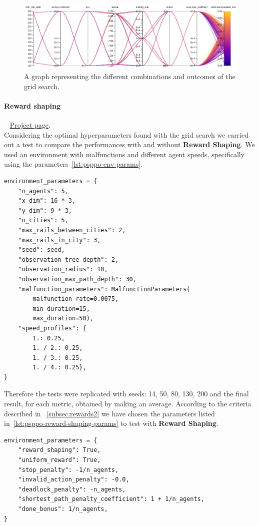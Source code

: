 \documentclass[11pt, a4paper, hidelinks]{report}
\begin{document}
\begin{figure}
\centering
\includegraphics[width=1.0\textwidth]{resources/psppo_sweep.png}
\caption{A graph representing the different combinations and outcomes of the grid search.}
\label{fig:psppo_sweep}
\end{figure}
\newpage

\paragraph{Reward shaping}\label{par:psppo_reward_shaping}
~\newline
\href{https://wandb.ai/fiorenzoparascandolo/flatland-challenge-ps-ppo-test}{Project page}.\\

Considering the optimal hyperparameters found with the grid search we carried out a test to compare the performances with and without \textbf{Reward Shaping}.
We used an environment with malfunctions and different agent speeds, specifically using the parameters~\ref{lst:psppo-env-params}.

\begin{lstlisting}[label={lst:psppo-env-params}]
environment_parameters = {
	"n_agents": 5,
	"x_dim": 16 * 3,
	"y_dim": 9 * 3,
	"n_cities": 5,
	"max_rails_between_cities": 2,
	"max_rails_in_city": 3,
	"seed": seed,
	"observation_tree_depth": 2,
	"observation_radius": 10,
	"observation_max_path_depth": 30,
	"malfunction_parameters": MalfunctionParameters(
		malfunction_rate=0.0075,
		min_duration=15,
		max_duration=50),
	"speed_profiles": {
		1.: 0.25,
		1. / 2.: 0.25,
		1. / 3.: 0.25,
		1. / 4.: 0.25},
}
\end{lstlisting}

Therefore the tests were replicated with seeds: 14, 50, 80, 130, 200 and the final result, for each metric, obtained by making an average.
According to the criteria described in ~\ref{subsec:rewards2} we have chosen the parameters listed in~\ref{lst:psppo-reward-shaping-params} to test with \textbf{Reward Shaping}.

\begin{lstlisting}[label={lst:psppo-reward-shaping-params}]
environment_parameters = {
	"reward_shaping": True,
	"uniform_reward": True,
	"stop_penalty": -1/n_agents,
	"invalid_action_penalty": -0.0,
	"deadlock_penalty": -n_agents,
	"shortest_path_penalty_coefficient": 1 + 1/n_agents,
	"done_bonus": 1/n_agents,
}
\end{lstlisting}
\end{document}
